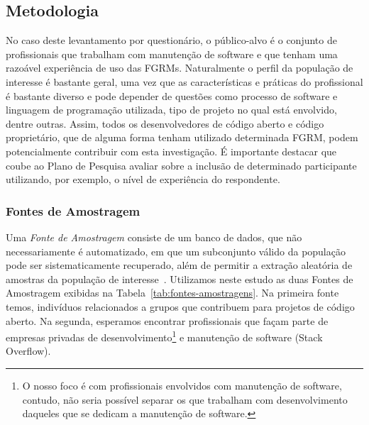 
\subsection{Metodologia}
\label{subsec:pesq_metodologias}

No caso deste levantamento por questionário, o público-alvo é o conjunto de
profissionais que trabalham com manutenção de software e que tenham uma razoável
experiência de uso das FGRMs. Naturalmente o perfil da população de interesse é
bastante geral, uma vez que as características e práticas do profissional é
bastante diverso e pode depender de questões como processo de software e
linguagem de programação utilizada, tipo de projeto no qual está envolvido,
dentre outras. Assim, todos os desenvolvedores de código aberto e código
proprietário, que de alguma forma tenham utilizado determinada FGRM, podem
potencialmente contribuir com esta investigação. É importante destacar que coube
ao Plano de Pesquisa avaliar sobre a inclusão de determinado participante
utilizando, por exemplo, o nível de experiência do respondente.

\subsubsection{Fontes de Amostragem}
\label{subsubsec:fontes_amostragem}


Uma \textit{Fonte de Amostragem} consiste de um banco de dados, que não
necessariamente é automatizado, em que um subconjunto válido da população pode
ser sistematicamente recuperado, além de permitir a extração aleatória de
amostras da população de interesse~\cite{de2014towards}. Utilizamos neste estudo
as duas Fontes de Amostragem exibidas na Tabela~\ref{tab:fontes-amostragens}.
Na primeira fonte temos, indivíduos relacionados a grupos que contribuem para
projetos de código aberto. Na segunda, esperamos encontrar profissionais que
façam parte de empresas privadas de desenvolvimento\footnote{O nosso foco é com
	profissionais envolvidos com manutenção de software, contudo, não seria
	possível separar os que trabalham com desenvolvimento daqueles que se
	dedicam a manutenção de software.} e manutenção de software (Stack
Overflow).

